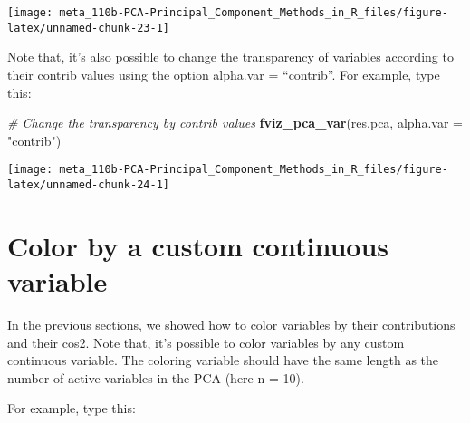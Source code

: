 \documentclass[]{book}
\newenvironment{Shaded}{\begin{snugshade}}{\end{snugshade}}
\newcommand{\CommentTok}[1]{\textcolor[rgb]{0.56,0.35,0.01}{\textit{#1}}}
\newcommand{\DataTypeTok}[1]{\textcolor[rgb]{0.13,0.29,0.53}{#1}}
\newcommand{\KeywordTok}[1]{\textcolor[rgb]{0.13,0.29,0.53}{\textbf{#1}}}
\newcommand{\NormalTok}[1]{#1}
\newcommand{\StringTok}[1]{\textcolor[rgb]{0.31,0.60,0.02}{#1}}
\begin{document}
\begin{Shaded}
\end{Shaded}

\begin{center}\texttt{[image: meta\_110b-PCA-Principal\_Component\_Methods\_in\_R\_files/figure-latex/unnamed-chunk-23-1]} \end{center}

Note that, it's also possible to change the transparency of variables according to their contrib values using the option alpha.var = ``contrib''. For example, type this:

\begin{Shaded}
\begin{Highlighting}[]
\CommentTok{# Change the transparency by contrib values}
\KeywordTok{fviz_pca_var}\NormalTok{(res.pca, }\DataTypeTok{alpha.var =} \StringTok{"contrib"}\NormalTok{)}
\end{Highlighting}
\end{Shaded}

\begin{center}\texttt{[image: meta\_110b-PCA-Principal\_Component\_Methods\_in\_R\_files/figure-latex/unnamed-chunk-24-1]} \end{center}

\hypertarget{color-by-a-custom-continuous-variable}{%
\section{Color by a custom continuous variable}\label{color-by-a-custom-continuous-variable}}

In the previous sections, we showed how to color variables by their contributions and their cos2. Note that, it's possible to color variables by any custom continuous variable. The coloring variable should have the same length as the number of active variables in the PCA (here n = 10).

For example, type this:
\end{document}
